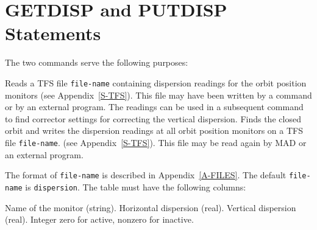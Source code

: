 \section{GETDISP and PUTDISP Statements}
\label{S-GETDISP}
The two commands
serve the following purposes:
\begin{mylist}
Reads a TFS file {\tt file-name} containing dispersion readings for the
orbit position monitors
(see Appendix~\ref{S-TFS}).
This file may have been written by a  command
or by an external program.
The readings can be used in a subsequent  command
to find corrector settings for correcting the vertical dispersion.
Finds the closed orbit and writes the dispersion readings at all orbit
position monitors on a TFS file {\tt file-name}.
(see Appendix~\ref{S-TFS}).
This file may be read again by MAD or an external program.
\end{mylist}
The format of {\tt file-name} is described in Appendix~\ref{A-FILES}.
The default {\tt file-name} is {\tt dispersion}.
The table must have the following columns:
\begin{mylist}
Name of the monitor (string).
Horizontal dispersion (real).
Vertical dispersion (real).
Integer zero for active, nonzero for inactive.
\end{mylist}
 
